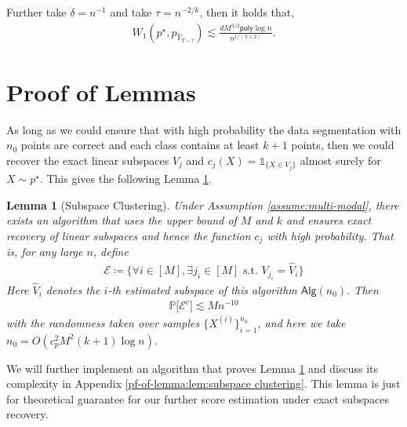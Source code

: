 \documentclass{article}
\newcommand{\ind}{\mathds{1}}
\newcommand{\defn}{\coloneqq}
\newcommand{\polylog}{\mathsf{poly}\log}
\theoremstyle{plain}
\newtheorem{lemma}{\bf Lemma}
\theoremstyle{remark}
\begin{document}
Further take $\delta = n^{-1}$ and take $\tau = n^{-2/k}$, then it holds that, 
\begin{align*}
    W_1(p^\star,p_{\widehat{Y}_{T-\tau}}) \lesssim \frac{dM^{3/2} \polylog n}{n^{1/(k\vee 2)}}.
\end{align*}
\section{Proof of Lemmas}
\label{sec:pf-of-lemmas}

As long as we could ensure that with high probability the data segmentation with $n_0$ points are correct and each class contains at least $k+1$ points, then we could recover the exact linear subspaces $V_j$ and $c_j(X) = \ind_{\{ X \in V_j\}}$ almost surely for $X \sim p^\star$. This gives the following Lemma \ref{lem:subspace clustering}. 
\begin{lemma}[Subspace Clustering]
    \label{lem:subspace clustering}
    Under Assumption \ref{assume:multi-modal}, there exists an algorithm that uses the upper bound of $M$ and $k$ and ensures exact recovery of linear subspaces and hence the function $c_j$ with high probability. That is, for any large $n$, define
    \begin{align*}
        \mathcal{E} \defn \Big\{ \forall i \in [M], \exists j_i \in [M] \text{ s.t. } V_{j_i}  = \widehat{V}_i \Big\}
    \end{align*}
    Here $\widehat{V}_i$ denotes the $i$-th estimated subspace of this algorithm $\mathsf{Alg}(n_0)$. Then 
    \begin{align*}
        \mathbb{P} \big[ \mathcal{E}^c\big] \lesssim Mn^{-10}
    \end{align*}
    with the randomness taken over samples $\{ X^{(i)}\}_{i=1}^{n_0}$, and here we take $n_0 = O(c_{p}^2M^2(k+1)\log n)$. 
\end{lemma}
We will further implement an algorithm that proves Lemma \ref{lem:subspace clustering} and discuss its complexity in Appendix \ref{pf-of-lemma:lem:subspace clustering}. 
This lemma is just for theoretical guarantee for our further score estimation under exact subspaces recovery. 
\end{document}
